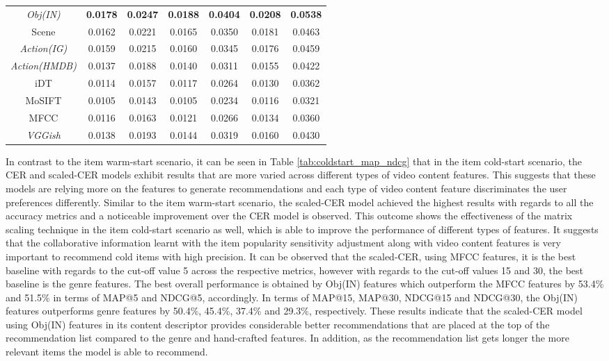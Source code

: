 \documentclass[review]{elsarticle}
\begin{document}
\begin{table}[H]
\begin{adjustbox}{width=\columnwidth}
\begin{tabular}{|c|c c c c c c|}
\textit{Obj(IN)} 	&\textbf{0.0178}	&\textbf{0.0247}	&\textbf{0.0188}	&\textbf{0.0404}	&\textbf{0.0208}	&\textbf{0.0538}	\\
Scene &0.0162	&0.0221	&0.0165	&0.0350	&0.0181	&0.0463	\\ 
\textit{Action(IG)} 	&0.0159	&0.0215	&0.0160	&0.0345	&0.0176	&0.0459	\\ 
\textit{Action(HMDB)} 	&0.0137	&0.0188	&0.0140	&0.0311	&0.0155	&0.0422	\\ 
iDT 	&0.0114	&0.0157	&0.0117	&0.0264	&0.0130	&0.0362	\\ 
MoSIFT 	&0.0105	&0.0143	&0.0105	&0.0234	&0.0116	&0.0321	\\ 
MFCC 	&0.0116	&0.0163	&0.0121	&0.0266	&0.0134	&0.0360	\\ 
\textit{VGGish} 	&0.0138	&0.0193	&0.0144	&0.0319	&0.0160	&0.0430	\\ \hline
    \end{tabular}
    \end{adjustbox}
\end{table}


In contrast to the item warm-start scenario, it can be seen in Table \ref{tab:coldstart_map_ndcg} that in the item cold-start scenario, the CER and scaled-CER models exhibit results that are more varied across different types of video content features. This suggests that these models are relying more on the features to generate recommendations and each type of video content feature discriminates the user preferences differently. Similar to the item warm-start scenario, the scaled-CER model achieved the highest results with regards to all the accuracy metrics and a noticeable improvement over the CER model is observed. This outcome shows the effectiveness of the matrix scaling technique in the item cold-start scenario as well, which is able to improve the performance of different types of features. It suggests that the collaborative information learnt with the item popularity sensitivity adjustment along with video content features is very important to recommend cold items with high precision. It can be observed that the scaled-CER, using MFCC features, it is the best baseline with regards to the cut-off value 5 across the respective metrics, however with regards to the cut-off values 15 and 30, the best baseline is the genre features. The best overall performance is obtained by Obj(IN) features which outperform the MFCC features by 53.4\% and 51.5\% in terms of MAP@5 and NDCG@5, accordingly. In terms of MAP@15, MAP@30, NDCG@15 and NDCG@30, the Obj(IN) features outperforms genre features by 50.4\%, 45.4\%, 37.4\% and 29.3\%, respectively. These results indicate that the scaled-CER model using Obj(IN) features in its content descriptor provides considerable better recommendations that are placed at the top of the recommendation list compared to the genre and hand-crafted features. In addition, as the recommendation list gets longer the more relevant items the model is able to recommend.  
\end{document}
